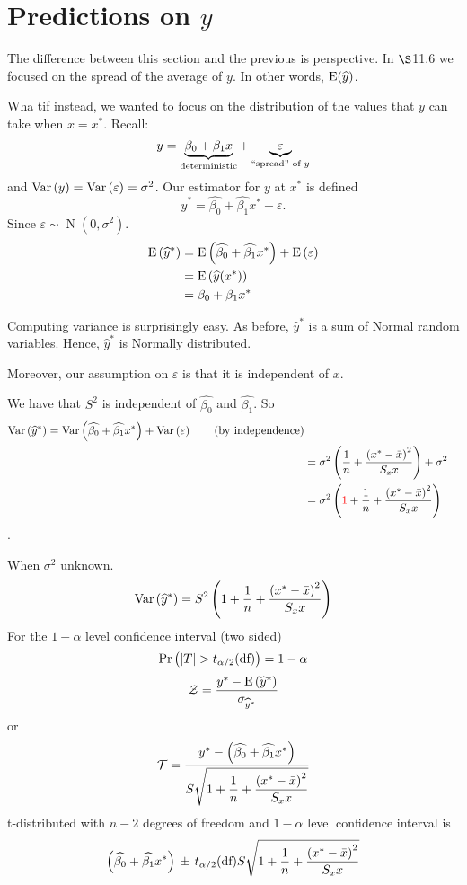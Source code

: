 \section{Predictions on $y$}
The difference between this section and the previous is perspective. In $\S$11.6 we focused on the spread of the average of $y$. In other words, $\E*{\widehat y}$.


\nl Wha tif instead, we wanted to focus on the distribution of the values that $y$ can take when $x = x^*$. Recall:
$$y = \underbrace{\beta_0 + \beta_1 x}_{\text{deterministic}} + \underbrace{\varepsilon}_{\text{\say{spread} of } y}$$
and $\Var{y} = \Var{\varepsilon} = \sigma^2$. Our estimator for $y$ at $x^*$ is defined 
$$\widehat y^* = \widehat{\beta_0} + \widehat{\beta_1} x^* + \varepsilon.$$
Since $\varepsilon \sim \operatorname{N}(0,\sigma^2)$.
\begin{align*}
    \E{\widehat{y}^*} &= \E{ \widehat{\beta_0} + \widehat{\beta_1} x^*} + \E{\varepsilon}\\
    &= \E{\widehat{y}(x^*)}\\
    &= \beta_0 + \beta_1 x^*
\end{align*}

Computing variance is surprisingly easy. As before, $\widehat{y}^*$ is a sum of Normal random variables. Hence, $\widehat y^*$ is Normally distributed.

\nl Moreover, our assumption on $\varepsilon$ is that it is independent of $x$.

\nl We have that $S^2$ is independent of $\widehat{\beta_0}$ and $\widehat{\beta_1}$. So 
\begin{align*}
    \Var{\widehat y^*} = \Var{\widehat{\beta_0} + \widehat{\beta_1} x^*} + \Var{\varepsilon} \tag{by independence}\\
    &= \sigma^2 \pars{\dfrac{1}{n} + \dfrac{\pars{x^* - \bar x}^2}{S_xx}} + \sigma^2 \\
    &= \sigma^2 \pars{\red{1} + \over{n} + \dfrac{\pars{x^* - \bar x}^2}{S_xx}}
\end{align*}
.

\nl When $\sigma^2$ unknown.
$$\Var{\widehat y^*} = S^2 \pars{1 + \over{n} + \dfrac{\pars{x^* - \bar x}^2}{S_xx}}$$
For the $1 - \alpha$ level confidence interval (two sided)
$$\Pr \pars{ \abs{T} > t_{\alpha/2} (\text{df})} = 1 - \alpha$$
$$\mathcal Z = \dfrac{y^* - \E{\widehat y^*}}{\sigma_{\widehat y^*}}$$
or
$$\mathcal T = \dfrac{y^* - \pars{\widehat{\beta_0} + \widehat{\beta_1} x^*}}{S \displaystyle \sqrt{1 + \over{n} + \dfrac{\pars{x^* - \bar x}^2}{S_xx}}}$$
t-distributed with $n-2$ degrees of freedom and $1-\alpha$ level confidence interval is 
$$\pars{\widehat{\beta_0} + \widehat{\beta_1} x^*} \, \pm \, t_{\alpha/2}(\text{df})S \displaystyle \sqrt{1 + \over{n} + \dfrac{\pars{x^* - \bar x}^2}{S_xx}}$$

